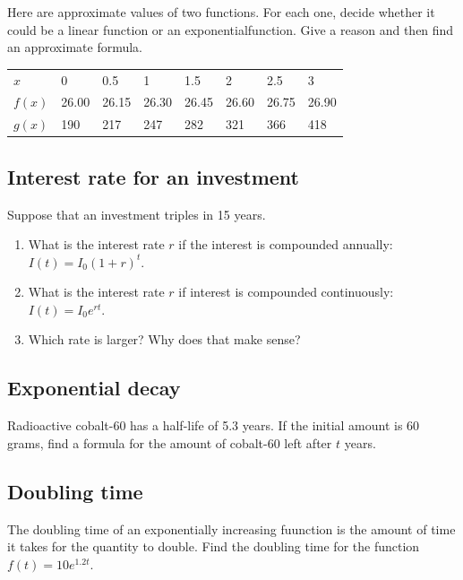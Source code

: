 \documentclass[
]{book}
\providecommand{\tightlist}{%
  \setlength{\itemsep}{0pt}\setlength{\parskip}{0pt}}
\begin{document}
Here are approximate values of two functions. For each one, decide whether it could be a linear function or an exponentialfunction. Give a reason and then find an approximate formula.

\begin{longtable}[]{@{}llllllll@{}}
\toprule
\endhead
\(x\) & 0 & 0.5 & 1 & 1.5 & 2 & 2.5 & 3\tabularnewline
\(f(x)\) & 26.00 & 26.15 & 26.30 & 26.45 & 26.60 & 26.75 & 26.90\tabularnewline
\(g(x)\) & 190 & 217 & 247 & 282 & 321 & 366 & 418\tabularnewline
\bottomrule
\end{longtable}

\hypertarget{interest-rate-for-an-investment}{%
\subsection{Interest rate for an investment}\label{interest-rate-for-an-investment}}

Suppose that an investment triples in 15 years.

\begin{enumerate}
\def\labelenumi{\arabic{enumi}.}
\tightlist
\item
  What is the interest rate \(r\) if the interest is compounded annually: \(I(t) = I_0 (1+r)^t\).
\item
  What is the interest rate \(r\) if interest is compounded continuously: \(I(t) = I_0 e^{rt}\).
\item
  Which rate is larger? Why does that make sense?
\end{enumerate}

\hypertarget{exponential-decay}{%
\subsection{Exponential decay}\label{exponential-decay}}

Radioactive cobalt-60 has a half-life of 5.3 years. If the initial amount is 60 grams, find a formula for the amount of cobalt-60 left after \(t\) years.

\hypertarget{doubling-time}{%
\subsection{Doubling time}\label{doubling-time}}

The doubling time of an exponentially increasing fuunction is the amount of time it takes for the quantity to double. Find the doubling time for the function \(f(t) = 10 e^{1.2t}\).
\end{document}
